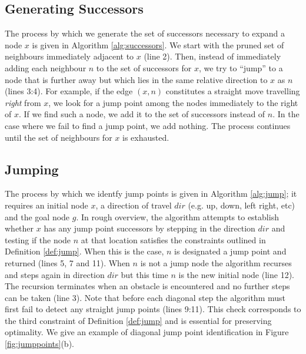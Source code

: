 \subsection{Generating Successors}
The process by which we generate the set of successors necessary to expand a
node $x$ is given in Algorithm \ref{alg:successors}.
We start with the pruned set of neighbours immediately adjacent to $x$ (line 2).
Then, instead of immediately adding each neighbour $n$ to the set of successors
for $x$, we try to ``jump'' to a node that is further away but which lies in the 
same relative direction to $x$ as $n$ (lines 3:4). 
For example, if the edge $(x, n)$ constitutes a
straight move travelling \emph{right} from $x$, we look for a jump point among
the nodes immediately to the right of $x$.
If we find such a node, we add it to the set of successors instead of $n$.
In the case where we fail to find a jump point, we add nothing.
The process continues until the set of neighbours for $x$ is exhausted.



\subsection{Jumping}
The process by which we identfy jump points is given in Algorithm
\ref{alg:jump}; it requires an initial node $x$, a direction of travel $dir$
(e.g. up, down, left right, etc) and the goal node $g$.
In rough overview, the algorithm attempts to establish whether $x$ has any 
jump point successors by stepping in the direction $dir$ and testing
if the node $n$ at that location satisfies the constraints outlined in 
Definition \ref{def:jump}.
When this is the case, $n$ is designated a jump point and returned (lines 5, 7
and 11).
When $n$ is not a jump node the algorithm recurses and steps again in direction
$dir$ but this time $n$ is the new initial node (line 12).
The recursion terminates when an obstacle is encountered and no further
steps can be taken (line 3).
Note that before each diagonal step the algorithm must first 
fail to detect any straight jump points (lines 9:11). 
This check corresponds to the third constraint of Definition \ref{def:jump} 
and is essential for preserving optimality.
We give an example of diagonal jump point identification in Figure
\ref{fig:jumppoints}(b).

